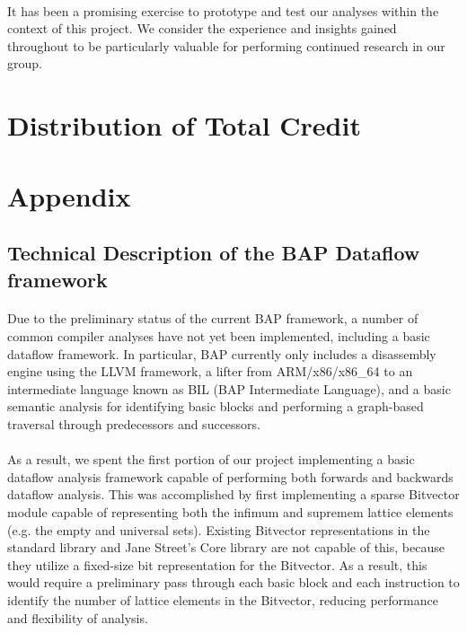 \documentclass[letterpaper,11pt]{article}
\begin{document}
\paragraph{}
It has been a promising exercise to prototype and test our
analyses within the context of this project. We consider the experience and
insights gained throughout to be particularly valuable for performing continued
research in our group.

\section{Distribution of Total Credit}

\clearpage

\appendix
\section{Appendix}
\label{appa1}
\subsection{Technical Description of the BAP Dataflow framework}

\paragraph{}
Due to the preliminary status of the current BAP framework, a number of common
compiler analyses have not yet been implemented, including a basic dataflow
framework. In particular, BAP currently only includes a disassembly engine
using the LLVM framework, a lifter from ARM/x86/x86\_64 to an intermediate
language known as BIL (BAP Intermediate Language), and a basic semantic
analysis for identifying basic blocks and performing a graph-based traversal
through predecessors and successors.

\paragraph{}
As a result, we spent the first portion of our project implementing a basic
dataflow analysis framework capable of performing both forwards and backwards
dataflow analysis. This was accomplished by first implementing a sparse
Bitvector module capable of representing both the infimum and supremem lattice
elements (e.g. the empty and universal sets). Existing Bitvector
representations in the standard library and Jane Street’s Core library are not
capable of this, because they utilize a fixed-size bit representation for the
Bitvector. As a result, this would require a preliminary pass through each
basic block and each instruction to identify the number of lattice elements in
the Bitvector, reducing performance and flexibility of analysis.
\end{document}
